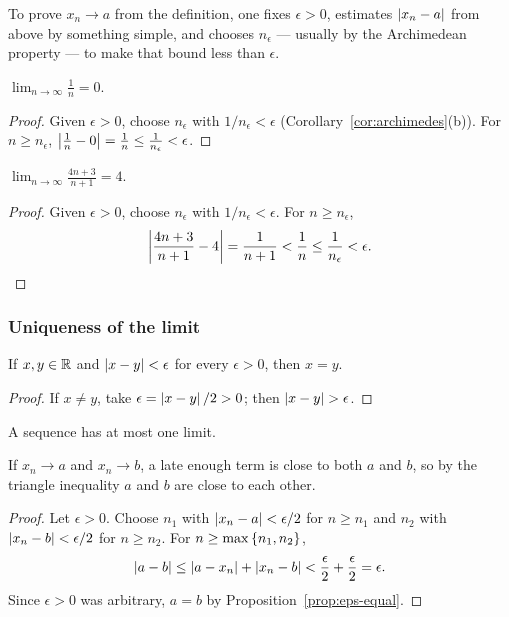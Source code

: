 To prove $x_n\to a$ from the definition, one fixes $\epsilon>0$, estimates
$\left|x_n-a\right|$ from above by something simple, and chooses $n_\epsilon$ ---
usually by the Archimedean property --- to make that bound less than
$\epsilon$.

\begin{example}\label{ex:1/n}
    $\lim_{n\to\infty}\frac1n=0$.
\end{example}

\begin{proof}
    Given $\epsilon>0$, choose $n_\epsilon$ with $1/n_\epsilon<\epsilon$
    (Corollary~\ref{cor:archimedes}(b)). For $n\geq n_\epsilon$,
    $\left|\frac1n-0\right|=\frac1n\leq\frac1{n_\epsilon}<\epsilon$.
\end{proof}

\begin{example}
    $\lim_{n\to\infty}\frac{4n+3}{n+1}=4$.
\end{example}

\begin{proof}
    Given $\epsilon>0$, choose $n_\epsilon$ with $1/n_\epsilon<\epsilon$. For
    $n\geq n_\epsilon$,
    \begin{equation*}
        \left|\frac{4n+3}{n+1}-4\right|
        =\frac1{n+1}<\frac1n\leq\frac1{n_\epsilon}<\epsilon.
    \end{equation*}
\end{proof}

\subsubsection{Uniqueness of the limit}
\begin{proposition}\label{prop:eps-equal}
    If $x,y\in\mathbb{R}$ and $\left|x-y\right|<\epsilon$ for every $\epsilon>0$, then $x=y$.
\end{proposition}

\begin{proof}
    If $x\ne y$, take $\epsilon=\left|x-y\right|/2>0$; then $\abs{x-y}>\epsilon$.
\end{proof}

\begin{theorem}\label{thm:limit-unique}
    A sequence has at most one limit.
\end{theorem}

If $x_n\to a$ and $x_n\to b$, a late enough term is close to both $a$ and
$b$, so by the triangle inequality $a$ and $b$ are close to each other.

\begin{proof}
    Let $\epsilon>0$. Choose $n_1$ with $\left|x_n-a\right|<\epsilon/2$ for
    $n\geq n_1$ and $n_2$ with $\left|x_n-b\right|<\epsilon/2$ for $n\geq n_2$. For
    $n\geq\max\left\{n_1,n_2\right\}$,
    \begin{equation*}
        \left|a-b\right|\leq\left|a-x_n\right|+\left|x_n-b\right|<\frac\epsilon2+\frac\epsilon2=\epsilon.
    \end{equation*}
    Since $\epsilon>0$ was arbitrary, $a=b$ by
    Proposition~\ref{prop:eps-equal}.
\end{proof}

